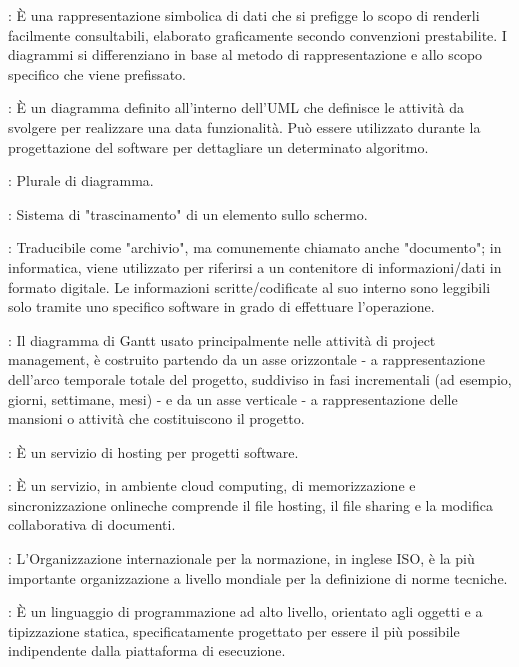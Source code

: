 {		: È una rappresentazione simbolica di dati che si prefigge lo scopo di renderli facilmente consultabili, elaborato graficamente secondo convenzioni prestabilite. I diagrammi si differenziano in base al metodo di rappresentazione e allo scopo specifico che viene prefissato.
	
		  : È un diagramma definito all'interno dell’UML che definisce le attività da svolgere per realizzare una data funzionalità. Può essere utilizzato durante la progettazione del software per dettagliare un determinato algoritmo.
		  	
		: Plurale di diagramma.
		
		: Sistema di "trascinamento" di un elemento sullo schermo.
		
	
		: Traducibile come "archivio", ma comunemente chiamato anche "documento"; in informatica, viene utilizzato per riferirsi a un contenitore di informazioni/dati in formato digitale. Le informazioni scritte/codificate al suo interno sono leggibili solo tramite uno specifico software in grado di effettuare l'operazione.
		
		: Il diagramma di Gantt usato principalmente nelle attività di project management, è costruito partendo da un asse orizzontale - a rappresentazione dell'arco temporale totale del progetto, suddiviso in fasi incrementali (ad esempio, giorni, settimane, mesi) - e da un asse verticale - a rappresentazione delle mansioni o attività che costituiscono il progetto.
		
		: È un servizio di hosting per progetti software.

		: È un servizio, in ambiente cloud computing, di memorizzazione e sincronizzazione onlineche comprende il file hosting, il file sharing e la modifica collaborativa di documenti.


		: L'Organizzazione internazionale per la normazione, in inglese ISO, è la più importante organizzazione a livello mondiale per la definizione di norme tecniche.		
	
		: È un linguaggio di programmazione ad alto livello, orientato agli oggetti e a tipizzazione statica, specificatamente progettato per essere il più possibile indipendente dalla piattaforma di esecuzione.
	
}
